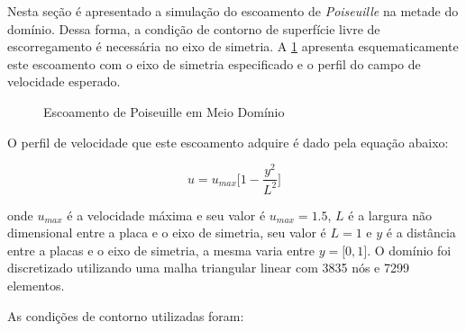 Nesta seção é apresentado a simulação do escoamento
de \textit{Poiseuille} na metade do domínio. Dessa forma,
a condição de contorno de superfície livre de escorregamento
é necessária no eixo de simetria.
A \ref{half poiseuille} apresenta esquematicamente este escoamento com o
eixo de simetria especificado e
o perfil do campo de velocidade esperado.

\begin{figure}[H]
\begin{center}
\end{center}
\caption{Escoamento de Poiseuille em Meio Domínio}
\label{half poiseuille}
\end{figure}

\noindent
O perfil de velocidade que este escoamento adquire 
é dado pela equação abaixo:

\begin{equation}
 u = u_{max} \big[ 1 - \frac{y^{2}}{L^{2}} \big]
\end{equation}


\medskip
\noindent
onde $u_{max}$ é a velocidade máxima e seu valor é
$u_{max} = 1.5$, $L$ é a largura não dimensional
entre a placa e o eixo de simetria, seu valor é $L = 1$
e $y$ é a distância entre a placas e o eixo de simetria,
a mesma varia entre $y = \big[ 0,1 \big]$.
O domínio foi discretizado utilizando uma malha 
triangular linear com 3835 nós e 7299 elementos. 

\medskip
\noindent
As condições de contorno utilizadas foram:

